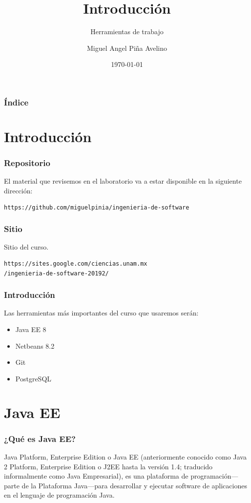 \documentclass{beamer}
\title[Laboratorio]{Introducción}
\subtitle{Herramientas de trabajo}
\author[Miguel]{Miguel Angel Piña Avelino}
\institute[UNAM]{
  Facultad de Ciencias, UNAM
}
\date{\today}
\begin{document}
\frame{\titlepage}

\begin{frame}
  \frametitle{Índice}
  \tableofcontents
\end{frame}

\section{Introducción}

\begin{frame}[fragile]
  \frametitle{Repositorio}
  El material que revisemos en el laboratorio va a estar disponible en
  la siguiente dirección:
\begin{verbatim}
https://github.com/miguelpinia/ingenieria-de-software
\end{verbatim}
\end{frame}

\begin{frame}[fragile]
  \frametitle{Sitio}
  Sitio del curso.
\begin{verbatim}
https://sites.google.com/ciencias.unam.mx
/ingenieria-de-software-20192/
\end{verbatim}
\end{frame}

\begin{frame}
  \frametitle{Introducción}
  Las herramientas más importantes del curso que usaremos serán:
  \begin{itemize}
    \item Java EE 8
    \item Netbeans 8.2
    \item Git
    \item PostgreSQL
  \end{itemize}
\end{frame}

\section{Java EE}

\begin{frame}
  \frametitle{¿Qué es Java EE?}
  Java Platform, Enterprise Edition o Java EE (anteriormente conocido
  como Java 2 Platform, Enterprise Edition o J2EE hasta la versión
  1.4; traducido informalmente como Java Empresarial), es una
  plataforma de programación—parte de la Plataforma Java—para
  desarrollar y ejecutar software de aplicaciones en el lenguaje de
  programación Java.
\end{frame}
\end{document}
